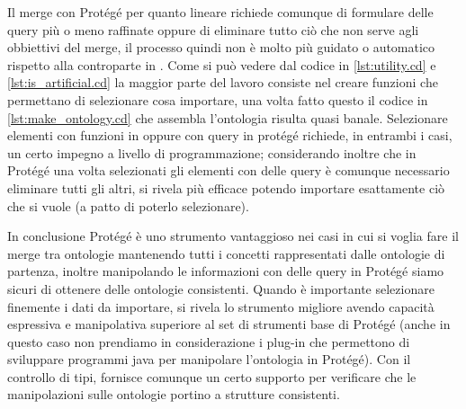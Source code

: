 Il merge con Protégé per quanto lineare richiede comunque di formulare delle query più o meno raffinate oppure di eliminare tutto ciò che non serve agli obbiettivi del merge, il processo quindi non è molto più guidato o automatico rispetto alla controparte in \cduce. Come si può vedere dal codice in \ref{lst:utility.cd} e \ref{lst:is_artificial.cd} la maggior parte del lavoro consiste nel creare funzioni che permettano di selezionare cosa importare, una volta fatto questo il codice in \ref{lst:make_ontology.cd} che assembla l'ontologia risulta quasi banale. Selezionare elementi con funzioni in \cduce oppure con query in protégé richiede, in entrambi i casi, un certo impegno a livello di programmazione; considerando inoltre che in Protégé una volta selezionati gli elementi con delle query è comunque necessario eliminare tutti gli altri, \cduce si rivela più efficace potendo importare esattamente ciò che si vuole (a patto di poterlo selezionare).

In conclusione Protégé è uno strumento vantaggioso nei casi in cui si voglia fare il merge tra ontologie mantenendo tutti i concetti rappresentati dalle ontologie di partenza, inoltre manipolando le informazioni con delle query in Protégé siamo sicuri di ottenere delle ontologie consistenti. Quando è importante selezionare finemente i dati da importare, \cduce si rivela lo strumento migliore avendo capacità espressiva e manipolativa superiore al set di strumenti base di Protégé (anche in questo caso non prendiamo in considerazione i plug-in che permettono di sviluppare programmi java per manipolare l'ontologia in Protégé). Con il controllo di tipi, \cduce fornisce comunque un certo supporto per verificare che le manipolazioni sulle ontologie portino a strutture consistenti.
